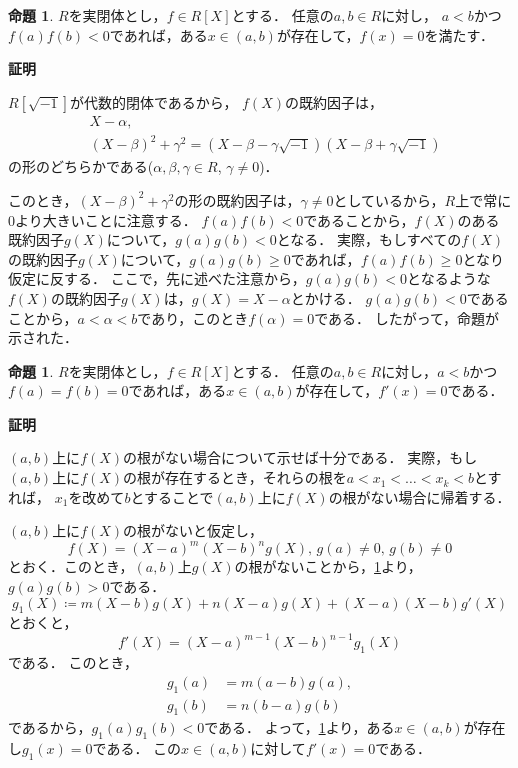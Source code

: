 \documentclass[uplatex, dvipdfmx]{jsarticle}
\makeatletter
\numberwithin{equation}{section}
\renewenvironment{proof}[1][\proofname]{\par
  \pushQED{\qed}%
  \normalfont \topsep6\p@\@plus6\p@\relax
  \trivlist
  \item\relax
  {\bfseries
  #1\@addpunct{.}}\hspace\labelsep\ignorespaces
}{
  \popQED\endtrivlist\@endpefalse
}
\theoremstyle{definition}
\newtheorem{proposition}[definition]{命題}
\renewcommand{\proofname}{\textbf{証明}}
\makeatother
\begin{document}
\begin{proposition}\label{proposition:intermediate}
     $R$を実閉体とし，$f \in R[X]$とする．
     任意の$a,b \in R$に対し，
     $a < b$かつ
     $f(a)f(b)<0$であれば，ある$x \in (a,b)$が存在して，$f(x)=0$を満たす．
\end{proposition}
\begin{proof}
     $R[\sqrt{-1}]$が代数的閉体であるから，
     $f(X)$の既約因子は，
     \begin{align}
          &X-\alpha, \\
          &(X-\beta)^2 + \gamma^2 = (X-\beta-\gamma\sqrt{-1})(X-\beta+\gamma\sqrt{-1})
     \end{align}
     の形のどちらかである($\alpha, \beta, \gamma \in R$, $\gamma \neq 0$)．

     このとき，$(X-\beta)^2 + \gamma^2$の形の既約因子は，$\gamma \neq 0$としているから，$R$上で常に$0$より大きいことに注意する．
     $f(a)f(b)<0$であることから，$f(X)$のある既約因子$g(X)$について，$g(a)g(b)<0$となる．
     実際，もしすべての$f(X)$の既約因子$g(X)$について，$g(a)g(b) \geq 0$であれば，$f(a)f(b)\geq0$となり仮定に反する．
     ここで，先に述べた注意から，$g(a)g(b)<0$となるような$f(X)$の既約因子$g(X)$は，$g(X) = X - \alpha$とかける．
     $g(a)g(b) < 0$であることから，$a<\alpha<b$であり，このとき$f(\alpha)=0$である．
     したがって，命題が示された．
\end{proof}

\begin{proposition}\label{proposition:Rolle}
     $R$を実閉体とし，$f \in R[X]$とする．
     任意の$a, b \in R$に対し，$a<b$かつ
     $f(a)=f(b)=0$であれば，ある$x \in (a,b)$が存在して，$f'(x)=0$である．
\end{proposition}
\begin{proof}
     $(a,b)$上に$f(X)$の根がない場合について示せば十分である．
     実際，もし$(a,b)$上に$f(X)$の根が存在するとき，それらの根を$a < x_1 < \dots < x_k < b$とすれば，
     $x_1$を改めて$b$とすることで$(a,b)$上に$f(X)$の根がない場合に帰着する．

     $(a,b)$上に$f(X)$の根がないと仮定し，
     \begin{equation}
     f(X) = (X-a)^m(X-b)^ng(X), \, g(a)\neq0,\, g(b)\neq0
     \end{equation}
     とおく．このとき，$(a,b)$上$g(X)$の根がないことから，\cref{proposition:intermediate}より，$g(a)g(b)>0$である．
     \begin{equation}
     g_1(X) \coloneqq m(X-b)g(X)+n(X-a)g(X)+(X-a)(X-b)g'(X)
     \end{equation}
     とおくと，
     \begin{equation}
          f'(X) = (X-a)^{m-1}(X-b)^{n-1}g_1(X)
     \end{equation}
     である．
     このとき，
     \begin{align}
     g_1(a) &= m(a-b)g(a), \\
     g_1(b) &= n(b-a)g(b)
     \end{align}
     であるから，$g_1(a)g_1(b)<0$である．
     よって，\cref{proposition:intermediate}より，ある$x \in (a, b)$が存在し$g_1(x)=0$である．
     この$x \in (a,b)$に対して$f'(x)=0$である．
\end{proof}
\end{document}
